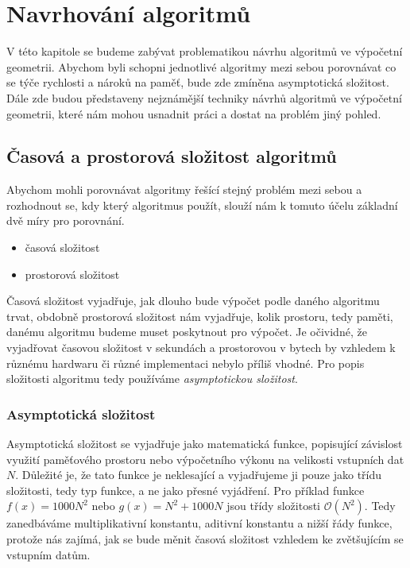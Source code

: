 \chapter{Navrhování algoritmů}
\label{chap:navrhovanialgoritmu}
	V této kapitole se budeme zabývat problematikou návrhu algoritmů ve výpočetní geometrii. Abychom byli schopni jednotlivé algoritmy mezi sebou porovnávat co se týče rychlosti a nároků na paměť, bude zde zmíněna asymptotická složitost. Dále zde budou představeny nejznámější techniky návrhů algoritmů ve výpočetní geometrii, které nám mohou usnadnit práci a dostat na problém jiný pohled.

\section{Časová a prostorová složitost algoritmů}
	Abychom mohli porovnávat algoritmy řešící stejný problém mezi sebou a rozhodnout se, kdy který algoritmus použít, slouží nám k tomuto účelu základní dvě míry pro porovnání.
\begin{itemize}
	\item časová složitost
	\item prostorová složitost
\end{itemize}
	Časová složitost vyjadřuje, jak dlouho bude výpočet podle daného algoritmu trvat, obdobně prostorová složitost nám vyjadřuje, kolik prostoru, tedy paměti, danému algoritmu budeme muset poskytnout pro výpočet. Je očividné, že vyjadřovat časovou složitost v sekundách a prostorovou v bytech by vzhledem k různému hardwaru či různé implementaci nebylo příliš vhodné. Pro popis složitosti algoritmu tedy používáme \textit{asymptotickou složitost}.
	
\subsection{Asymptotická složitost}
	Asymptotická složitost se vyjadřuje jako matematická funkce, popisující závislost využití paměťového prostoru nebo výpočetního výkonu na velikosti vstupních dat $N$. Důležité je, že tato funkce je neklesající a vyjadřujeme ji pouze jako třídu složitosti, tedy typ funkce, a ne jako přesné vyjádření. Pro příklad funkce $f(x)=1000N^2$ nebo $g(x)=N^2 + 1000N$ jsou třídy složitosti $\mathcal{O} (N^2)$. Tedy zanedbáváme multiplikativní konstantu, aditivní konstantu a nižší řády funkce, protože nás zajímá, jak se bude měnit časová složitost vzhledem ke zvětšujícím se vstupním datům.
	
